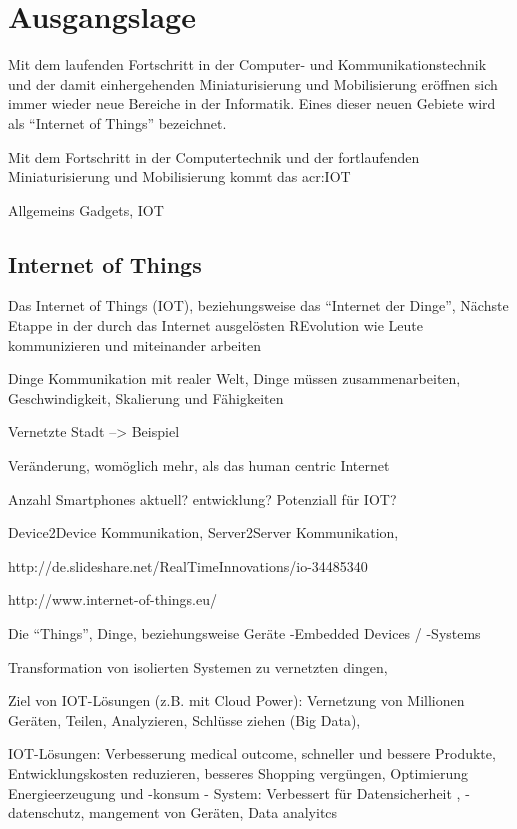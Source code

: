 \chapter{Ausgangslage}

Mit dem laufenden Fortschritt in der Computer- und Kommunikationstechnik und der damit einhergehenden Miniaturisierung und Mobilisierung eröffnen sich immer wieder neue Bereiche in der Informatik. Eines dieser neuen Gebiete wird als "`Internet of Things"' bezeichnet.

Mit dem Fortschritt in der Computertechnik und der fortlaufenden Miniaturisierung und Mobilisierung kommt das \gls{acr:IOT}

Allgemeins Gadgets, IOT



\section{Internet of Things}
Das Internet of Things (IOT), beziehungsweise das "`Internet der Dinge"', 
Nächste Etappe in der durch das Internet ausgelösten REvolution wie Leute kommunizieren und miteinander arbeiten

Dinge Kommunikation mit realer Welt, Dinge müssen zusammenarbeiten, Geschwindigkeit, Skalierung und Fähigkeiten

Vernetzte Stadt --> Beispiel

Veränderung, womöglich mehr, als das human centric Internet


Anzahl Smartphones aktuell? entwicklung?
Potenziall für IOT?

Device2Device Kommunikation, Server2Server Kommunikation, 

http://de.slideshare.net/RealTimeInnovations/io-34485340

http://www.internet-of-things.eu/


Die "`Things"', Dinge, beziehungsweise Geräte
-Embedded Devices / -Systems

Transformation von isolierten Systemen zu vernetzten dingen, 

Ziel von IOT-Lösungen (z.B. mit Cloud Power): Vernetzung von Millionen Geräten, Teilen, Analyzieren, Schlüsse ziehen (Big Data), 

IOT-Lösungen: Verbesserung medical outcome, schneller und bessere Produkte, Entwicklungskosten reduzieren, besseres Shopping vergüngen, Optimierung Energieerzeugung und -konsum - System: Verbessert für Datensicherheit , -datenschutz, mangement von Geräten, Data analyitcs

